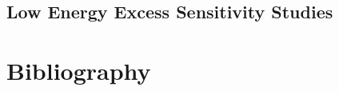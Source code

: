 \documentclass[11pt,openright,twoside,letterpaper,onecolumn]{report} %
\begin{document}
% 

\chapter{Low Energy Excess Sensitivity Studies}
\label{sec:LEEsensitivity}


% 

% 

% 

% 

\part{Bibliography}

 
\end{document}
